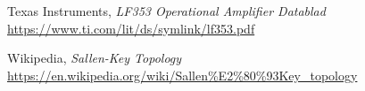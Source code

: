     Texas Instruments,
    \emph{LF353 Operational Amplifier Datablad}
    \url{https://www.ti.com/lit/ds/symlink/lf353.pdf}

    Wikipedia,
    \emph{Sallen-Key Topology}
    \url{https://en.wikipedia.org/wiki/Sallen\%E2\%80\%93Key\_topology}
